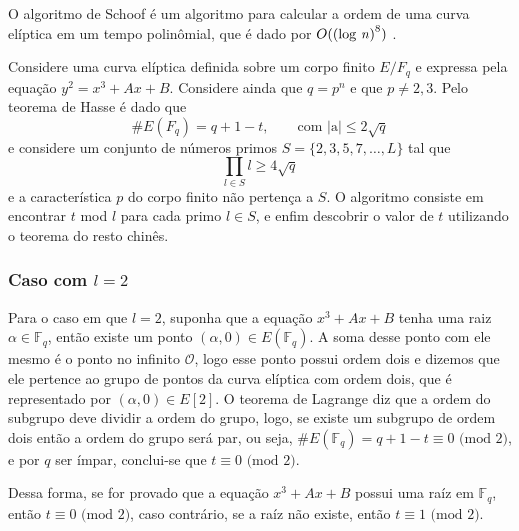 \begin{apendicesenv}
O algoritmo de Schoof é um algoritmo para calcular a ordem de uma curva elíptica em um tempo polinômial, que é dado por $O(\mbox{(log \textit{n})}^8)$ \cite{Silverman:2009}.

Considere uma curva elíptica definida sobre um corpo finito $E/F_q$ e expressa pela equação $y^2 = x^3 + Ax + B$. Considere ainda que $q = p^n$ e que $p \neq 2,3$. Pelo teorema de Hasse é dado que
$$
\#E(F_q) = q + 1 - t, \qquad \mbox{com |a|} \leq 2 \sqrt{q}
$$
e considere um conjunto de números primos $S = \{2,3,5,7,\dots,L\}$ tal que 
$$
\prod_{l \in S} l \geq 4 \sqrt{q}
$$
e a característica $p$ do corpo finito não pertença a $S$.
O algoritmo consiste em encontrar $t$ mod $l$ para cada primo $l \in S$, e enfim descobrir o valor de $t$ utilizando o teorema do resto chinês.\cite{Alvarado:2005}

\subsubsection{Caso com $l=2$}
Para o caso em que $l = 2$, suponha que a equação $x^3 + Ax + B$ tenha uma raiz $\alpha \in \mathbb{F}_q$, então existe um ponto $(\alpha, 0) \in E(\mathbb{F}_q)$. A soma desse ponto com ele mesmo é o ponto no infinito $\mathcal{O}$, logo esse ponto possui ordem dois e dizemos que ele pertence ao grupo de pontos da curva elíptica com ordem dois, que é representado por $(\alpha,0) \in E[2]$. O teorema de Lagrange diz que a ordem do subgrupo deve dividir a ordem do grupo, logo, se existe um subgrupo de ordem dois então a ordem do grupo será par, ou seja, $\#E(\mathbb{F}_q) = q + 1 - t \equiv 0\mbox{ (mod 2)}$, e por $q$ ser ímpar, conclui-se que $t \equiv 0 \mbox{ (mod 2)}$. \cite{Alvarado:2005}

Dessa forma, se for provado que a equação $x^3 + Ax + B$ possui uma raíz em $\mathbb{F}_q$, então $t \equiv 0 \mbox{ (mod 2)}$, caso contrário, se a raíz não existe, então $t \equiv 1 \mbox{ (mod 2)}$.\cite{McGee:2006}


\end{apendicesenv}
